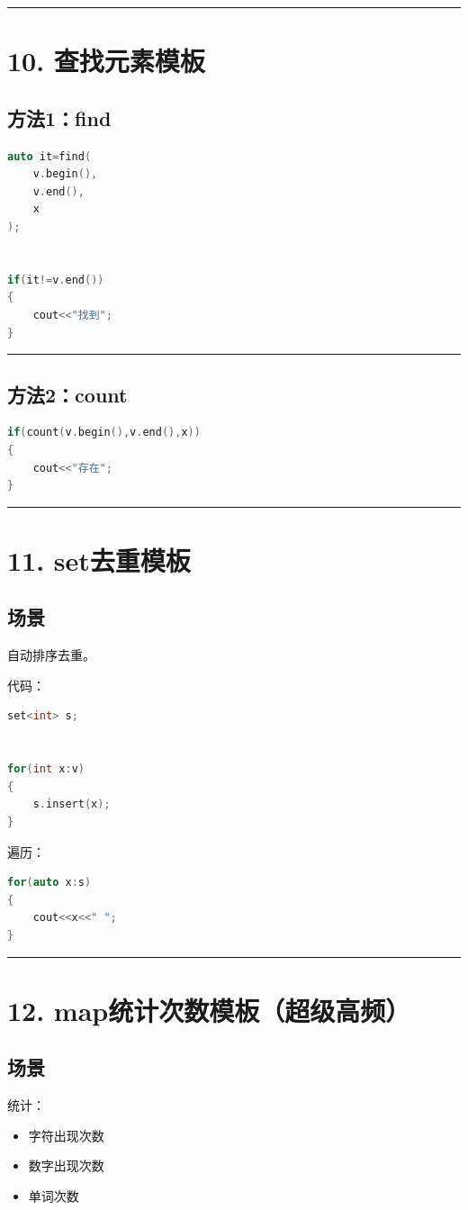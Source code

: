 \documentclass[10pt,twocolumn]{extarticle}
\begin{document}
\noindent\rule{\linewidth}{0.4pt}

\section{10. 查找元素模板}

\subsection{方法1：find}
\begin{lstlisting}[language=C++]
auto it=find(
    v.begin(),
    v.end(),
    x
);


if(it!=v.end())
{
    cout<<"找到";
}
\end{lstlisting}

\noindent\rule{\linewidth}{0.4pt}

\subsection{方法2：count}
\begin{lstlisting}[language=C++]
if(count(v.begin(),v.end(),x))
{
    cout<<"存在";
}
\end{lstlisting}

\noindent\rule{\linewidth}{0.4pt}

\section{11. set去重模板}

\subsection{场景}
自动排序去重。

代码：
\begin{lstlisting}[language=C++]
set<int> s;


for(int x:v)
{
    s.insert(x);
}
\end{lstlisting}
遍历：
\begin{lstlisting}[language=C++]
for(auto x:s)
{
    cout<<x<<" ";
}
\end{lstlisting}

\noindent\rule{\linewidth}{0.4pt}

\section{12. map统计次数模板（超级高频）}

\subsection{场景}
统计：
\begin{itemize}
    \item 字符出现次数
    \item 数字出现次数
    \item 单词次数
\end{itemize}
\end{document}

